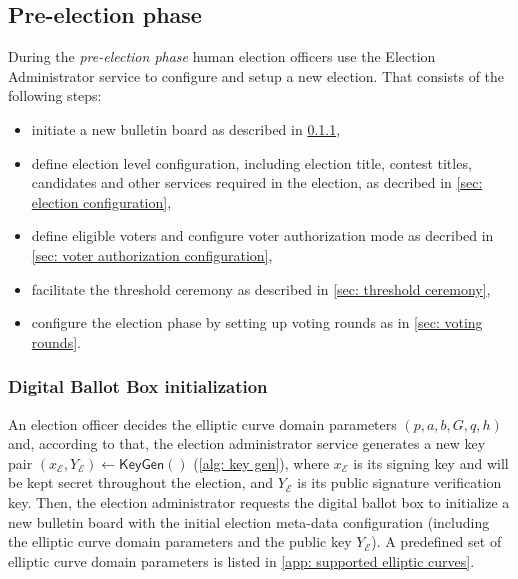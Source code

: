 \subsection{Pre-election phase} \label{sec: pre-election phase}
During the \textit{pre-election phase} human election officers use the Election Administrator service to configure and setup a new election. That consists of the following steps:
\begin{itemize}
    \item initiate a new bulletin board as described in \cref{sec: digital ballot box initialization},
    \item define election level configuration, including election title, contest titles, candidates and other services required in the election, as decribed in \cref{sec: election configuration},
    \item define eligible voters and configure voter authorization mode as decribed in \cref{sec: voter authorization configuration},
    \item facilitate the threshold ceremony as described in \cref{sec: threshold ceremony},
    \item configure the election phase by setting up voting rounds as in \cref{sec: voting rounds}.
\end{itemize}


\subsubsection{Digital Ballot Box initialization} \label{sec: digital ballot box initialization}
An election officer decides the elliptic curve domain parameters $(p, a, b, G, q, h)$ and, according to that, the election administrator service generates a new key pair $(x_\mathcal{E}, Y_\mathcal{E}) \gets \mathsf{KeyGen}()$ (\cref{alg: key gen}), where $x_\mathcal{E}$ is its signing key and will be kept secret throughout the election, and $Y_\mathcal{E}$ is its public signature verification key. Then, the election administrator requests the digital ballot box to initialize a new bulletin board with the initial election meta-data configuration (including the elliptic curve domain parameters and the public key $Y_\mathcal{E}$). A predefined set of elliptic curve domain parameters is listed in \cref{app: supported elliptic curves}.

